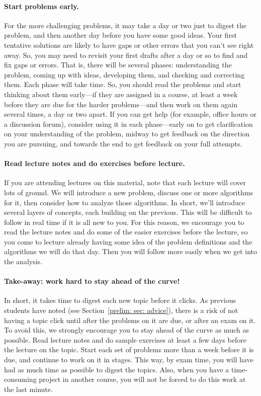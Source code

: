 \documentclass[11pt]{article}
\begin{document}
\paragraph{Start problems early.}
For the more challenging problems,
it may take a day or two just to digest the problem,
and then another day before you have some good ideas.
Your first tentative solutions are likely to have gaps or other errors that you can't see right away.
So, you may need to revisit your first drafts after a day or so to find and fix gaps or errors.
That is, there will be several phases: understanding the problem, coming up with ideas,
developing them, and checking and correcting them. Each phase will take time.
So, you should read the problems and start thinking about them early---if they are assigned in a course, at least a week before they are due for the harder problems---and then work on them again several times, a day or two apart.
If you can get help (for example, office hours or a discussion forum), consider using it in each phase---early on to get clarification on your understanding of the problem,
midway to get feedback on the direction you are pursuing,
and towards the end to get feedback on your full attempts.

\paragraph{Read lecture notes and do exercises before lecture.}
If you are attending lectures on this material, note that each lecture will cover lots of ground.  We will introduce a new problem, discuss one or more algorithms for it, then consider how to analyze those algorithms.  In short, we'll introduce several layers of concepts, each building on the previous.  This will be difficult to follow in real time if it is all new to you.  For this reason, we encourage you to read the lecture notes and do some of the easier exercises before the lecture, so you come to lecture already having some idea of the problem definitions and the algorithms we will do that day.  Then you will follow more easily when we get into the analysis.

\paragraph{Take-away: work hard to stay ahead of the curve!}
In short, it takes time to digest each new topic before it clicks.
As previous students have noted (see Section~\ref{prelim: sec: advice}), there is a risk of not having a topic click
until after the problems on it are due, or after an exam on it.
To avoid this, we strongly encourage you to stay ahead of the curve as much as possible.
Read lecture notes and do sample exercises at least a few days before the lecture on the topic.
Start each set of problems more than a week before it is due,
and continue to work on it in stages.
This way, by exam time, you will have had as much time as possible to digest the topics.
Also, when you have a time-consuming project in another course,
you will not be forced to do this work at the last minute.
\end{document}
